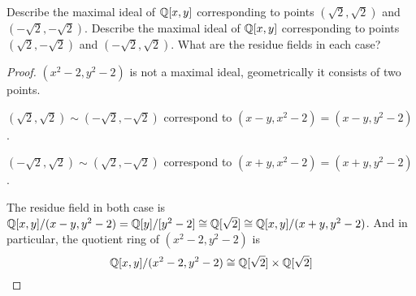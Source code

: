 \documentclass[11pt,fleqn]{book}
\begin{document}
\begin{exr}
Describe the maximal ideal of  $\mathbb Q[x,y]$ corresponding to points $(\sqrt 2,\sqrt 2)$
and $(-\sqrt2, -\sqrt 2)$. Describe the maximal ideal of $\mathbb Q[x, y]$ corresponding to points $( \sqrt 2, -\sqrt 2)$ and $(-\sqrt2, \sqrt 2)$. What are the residue fields in each case?
\end{exr}
\begin{proof}
 $(x^2-2,y^2-2)$ is not a maximal ideal, geometrically it consists of two points.

$(\sqrt 2,\sqrt 2)\sim(-\sqrt 2,-\sqrt 2)$ correspond to $(x-y,x^2-2)=(x-y,y^2-2)$.

$(-\sqrt 2,\sqrt 2)\sim(\sqrt 2,-\sqrt 2)$ correspond to $(x+y,x^2-2)=(x+y,y^2-2)$.

The residue field in both case is $\mathbb Q[x,y]/(x-y,y^2-2)=\mathbb Q[y]/[y^2-2]\cong \mathbb Q[\sqrt 2]\cong \mathbb Q[x,y]/(x+y,y^2-2)$. And in particular, the quotient ring of $(x^2-2,y^2-2)$ is
$$
\mathbb Q[x,y]/(x^2-2,y^2-2)\cong \mathbb Q[\sqrt2]\times \mathbb Q[\sqrt 2]
$$

\end{proof}
\end{document}
